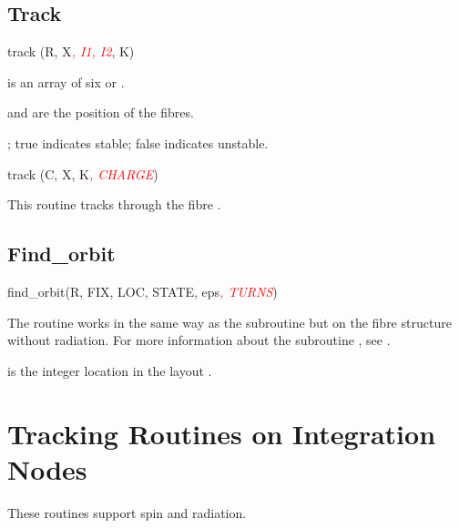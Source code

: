 \subsection{Track}

%
\begin{ptccode}
track (R, X\textit{\textcolor{red}{, I1, I2}}, K)
\end{ptccode}

 is an array of six  or .

 and  are the position of the fibres.


; true indicates stable; false indicates unstable.

\begin{ptccode}
track (C, X, K\textit{\textcolor{red}{, CHARGE}})
\end{ptccode}

This routine tracks through the fibre .


\subsection{Find\_orbit}

%
\begin{ptccode}
find_orbit(R, FIX, LOC, STATE, eps\textit{\textcolor{red}{, TURNS}})
\end{ptccode}

The  routine works in the same way as the
subroutine  but on the fibre structure
without radiation. For more information about the subroutine
, see .

 is the integer location in the layout .


\section{Tracking Routines on Integration Nodes}

%
These routines support spin and radiation.


